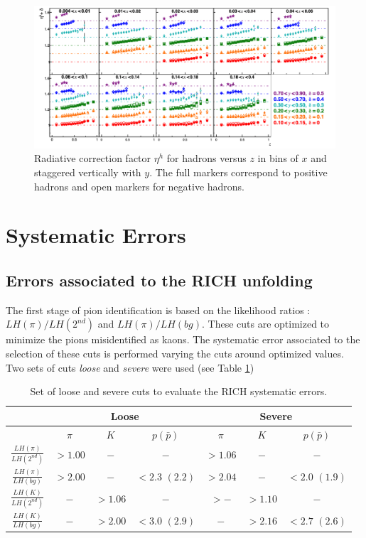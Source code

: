 \documentclass[letterpaper,12pt]{article}
\begin{document}
\begin{figure}
	\includegraphics[scale=0.5]{./gfx/RadCor.png}
	\caption{Radiative correction factor $\eta^{h}$ for hadrons versus $z$ in bins of $x$ and staggered vertically with $y$. The full markers correspond to positive hadrons and open markers for negative hadrons.}
	\label{RadCor}
\end{figure}

\newpage

\section{Systematic Errors} \label{Sys}

\subsection{Errors associated to the RICH unfolding}

The first stage of pion identification is based on the likelihood ratios : $LH(\pi)/LH(2^{nd})$ and $LH(\pi)/LH(bg)$. These cuts are optimized to minimize the
pions misidentified as kaons. The systematic error associated to the selection of these cuts is performed varying the cuts around optimized values. Two sets of
cuts \textit{loose} and \textit{severe} were used (see Table \ref{loose.severe})

\begin{table}[!h]
	\centering
	\begin{tabular}{ccccccc}
		\hline
		 & \multicolumn{3}{c}{Loose} & \multicolumn{3}{c}{Severe} \\
		\hline
		 & $\pi$ & $K$ & $p(\bar{p})$ & $\pi$ & $K$ & $p(\bar{p})$ \\
		\hline
		$\frac{LH(\pi)}{LH(2^{nd})}$ & $> 1.00$ & $-$ & $-$ & $>1.06$ & $-$ & $-$ \\
		$\frac{LH(\pi)}{LH(bg)}$ & $> 2.00$ & $-$ & $<2.3$ $(2.2)$ & $>2.04$ & $-$ & $<2.0$ $(1.9)$ \\
		$\frac{LH(K)}{LH(2^{nd})}$ & $-$ & $>1.06$ & $-$ & $>-$ & $>1.10$ & $-$ \\
		$\frac{LH(K)}{LH(bg)}$ & $-$ & $>2.00$ & $<3.0$ $(2.9)$ & $-$ & $>2.16$ & $<2.7$ $(2.6)$ \\
		\hline
	\end{tabular}
  \caption{Set of loose and severe cuts to evaluate the RICH systematic errors.}
  \label{loose.severe}
\end{table}
\end{document}

